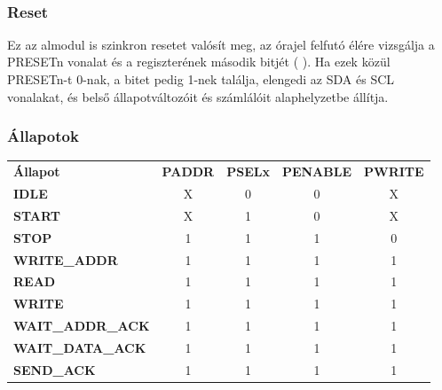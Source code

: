     \begin{figure}
        \centering
        \\[2ex]
        \caption{}
        \label{fig:reg}
    \end{figure}

\subsubsection{Reset}
    Ez az almodul is szinkron resetet valósít meg, az órajel felfutó élére vizsgálja a PRESETn vonalat és a regiszterének második bitjét (  ). Ha ezek közül PRESETn-t 0-nak, a bitet pedig 1-nek találja, elengedi az SDA és SCL vonalakat, és belső állapotváltozóit és számlálóit alaphelyzetbe állítja.

\subsubsection{Állapotok}
\begin{tabular}{l|c|c|c|c}
    \textbf{Állapot}    & \textbf{PADDR} & \textbf{PSELx} & \textbf{PENABLE}   & \textbf{PWRITE}    \\
    \textbf{IDLE}           &   X            & 0              & 0                  & X              \\
    \textbf{START}          &   X            & 1              & 0                  & X              \\
    \textbf{STOP}           &   1            & 1              & 1                  & 0              \\
    \textbf{WRITE\_ADDR}     &   1            & 1              & 1                  & 1              \\
    \textbf{READ}           &   1            & 1              & 1                  & 1              \\
    \textbf{WRITE}          &   1            & 1              & 1                  & 1              \\
    \textbf{WAIT\_ADDR\_ACK}  &   1            & 1              & 1                  & 1              \\
    \textbf{WAIT\_DATA\_ACK}  &   1            & 1              & 1                  & 1              \\
    \textbf{SEND\_ACK}       &   1            & 1              & 1                  & 1
\end{tabular}
